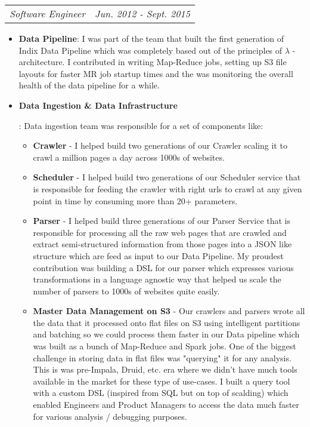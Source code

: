 \documentclass[letterpaper,11pt]{article}
\makeatletter
\newcommand{\resumeItem}[2]{
  \item\small{
    \textbf{#1}{: #2 \vspace{-2pt}}
  }
}
\newcommand{\resumeSubSubheading}[2]{
    \begin{tabular*}{0.97\textwidth}{l@{\extracolsep{\fill}}r}
      \textit{\small#1} & \textit{\small #2} \\
    \end{tabular*}\vspace{-5pt}
}
\newcommand{\resumeItemListStart}{\begin{itemize}}
\newcommand{\resumeItemListEnd}{\end{itemize}\vspace{-5pt}}
\makeatother
\begin{document}
    \resumeSubSubheading
      {Software Engineer}{Jun. 2012 - Sept. 2015}
      \resumeItemListStart
        \resumeItem{Data Pipeline}
        {
          I was part of the team that built the first generation of Indix Data Pipeline which was completely based out of the principles of $\lambda$ - architecture. I contributed in writing
          Map-Reduce jobs, setting up S3 file layouts for faster MR job startup times and the was monitoring the overall health of the data pipeline for a while.
        }
        \resumeItem{Data Ingestion \& Data Infrastructure}
        {
          Data ingestion team was responsible for a set of components like:
          \begin{itemize}
            \item{
              \textbf{Crawler} - I helped build two generations of our Crawler scaling it to crawl a million pages a day across 1000s of websites.
            }
            \item{
              \textbf{Scheduler} - I helped build two generations of our Scheduler service that is responsible for feeding the crawler with right urls to crawl at any given point in time by consuming more than 20+ parameters.
            }
            \item{
              \textbf{Parser} - I helped build three generations of our Parser Service that is responsible for processing all the raw web pages that are crawled and extract semi-structured information from those pages into a JSON like structure which are feed as input to our Data Pipeline. My proudest contribution was building a DSL for our parser which expresses various transformations in a language agnostic way that helped us scale the number of parsers to 1000s of websites quite easily.
            }
            \pagebreak
            \item{
              \textbf{Master Data Management on S3} - Our crawlers and parsers wrote all the data that it processed onto flat files on S3 using intelligent partitions and batching so we could process them faster in our Data pipeline which was built as a bunch of Map-Reduce and Spark jobs. One of the biggest challenge in storing data in flat files was "querying" it for any analysis. This is was pre-Impala, Druid, etc. era where we didn't have much tools available in the market for these type of use-cases. I built a query tool with a custom DSL (inspired from SQL but on top of scalding) which enabled Engineers and Product Managers to access the data much faster for various analysis / debugging purposes.
            }
          \end{itemize}\vspace{-4pt}
        }
      \resumeItemListEnd
\end{document}
